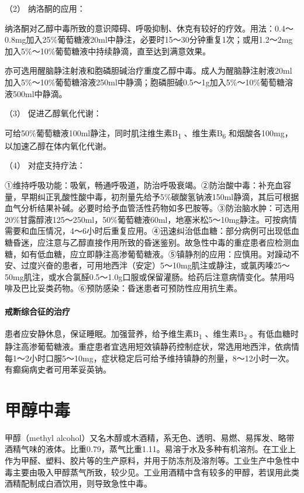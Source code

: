 \hypertarget{text00151.htmlux5cux23CHP5-5-1-3-1-2}{}
（2） 纳洛酮的应用：

纳洛酮对乙醇中毒所致的意识障碍、呼吸抑制、休克有较好的疗效。用法：0.4～0.8mg加入25\%葡萄糖液20ml中静注，必要时15～30分钟重复1次；或用1.2～2mg加入5\%～10\%葡萄糖液中持续静滴，直至达到满意效果。

亦可选用醒脑静注射液和胞磷胆碱治疗重度乙醇中毒。成人为醒脑静注射液20ml加入5\%～10\%葡萄糖溶液250ml中静滴；胞磷胆碱0.5～1g加入5\%～10\%葡萄糖溶液500ml中静滴。

\hypertarget{text00151.htmlux5cux23CHP5-5-1-3-1-3}{}
（3） 促进乙醇氧化代谢：

可给50\%葡萄糖液100ml静注，同时肌注维生素B\textsubscript{1}
、维生素B\textsubscript{6} 和烟酸各100mg，以加速乙醇在体内氧化代谢。

\hypertarget{text00151.htmlux5cux23CHP5-5-1-3-1-4}{}
（4） 对症支持疗法：

①维持呼吸功能：吸氧，畅通呼吸道，防治呼吸衰竭。②防治酸中毒：补充血容量，早期纠正乳酸性酸中毒，初剂量先给予5\%碳酸氢钠液150ml静滴，其后可根据血气分析结果补碱。必要时给予血管活性药物如多巴胺等。③防治脑水肿：可选用20\%甘露醇液125～250ml，50\%葡萄糖液60ml，地塞米松5～10mg静注。可按病情需要和血压情况，4～6小时后重复应用。④迅速纠治低血糖：部分病例可出现低血糖昏迷，应注意与乙醇直接作用所致的昏迷鉴别。故急性中毒的重症患者应检测血糖，如有低血糖，应立即静注高渗葡萄糖液。⑤镇静剂的应用：应慎用。对躁动不安、过度兴奋的患者，可用地西泮（安定）5～10mg肌注或静注，或氯丙嗪25～50mg肌注，或水合氯醛0.5～1.0g口服或保留灌肠。给药后注意病情变化。禁用吗啡及巴比妥类药物。⑥预防感染：昏迷患者可预防性应用抗生素。

\paragraph{戒断综合征的治疗}

患者应安静休息，保证睡眠。加强营养，给予维生素B\textsubscript{1}
、维生素B\textsubscript{2}
。有低血糖时静注高渗葡萄糖液。重症患者宜选用短效镇静药控制症状，常选用地西泮，依病情每1～2小时口服5～10mg，症状稳定后可给予维持镇静的剂量，8～12小时一次。有癫痫病史者可用苯妥英钠。

\protect\hypertarget{text00152.html}{}{}

\section{甲醇中毒}

甲醇（methyl
alcohol）又名木醇或木酒精，系无色、透明、易燃、易挥发、略带酒精气味的液体。比重0.79，蒸气比重1.11。易溶于水及多种有机溶剂。在工业上作为甲醛、塑料、胶片等的生产原料，并用于防冻剂及溶剂等。工业生产中急性中毒主要由吸入甲醇蒸气所致，较少见。工业用酒精中含有较多的甲醇，若误用此类酒精配制成白酒饮用，则导致急性中毒。

